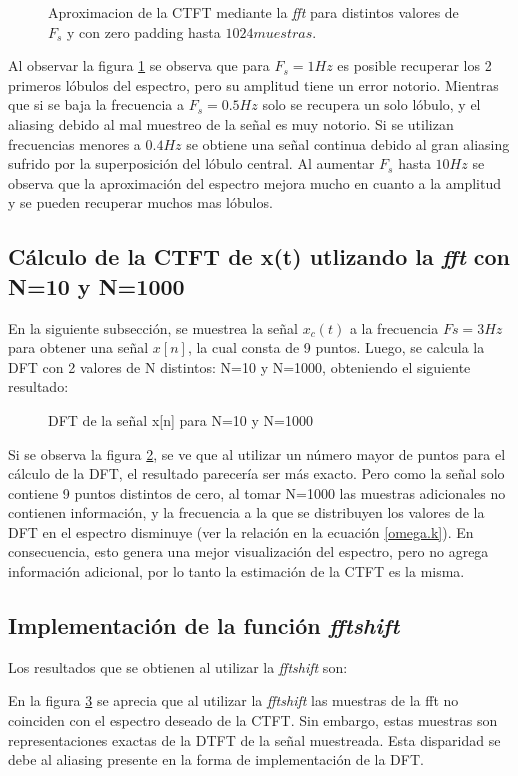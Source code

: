 \documentclass[11pt,a4paper]{article}
\begin{document}
\begin{figure}[H]
    \centering
    \caption{Aproximacion de la CTFT mediante la \textit{fft} para distintos valores de $F_s$ y con zero padding hasta $1024muestras$.}
    \label{fig.4d}
\end{figure}

Al observar la figura \ref{fig.4d} se observa que para $F_s=1Hz$ es posible recuperar los 2 primeros lóbulos del espectro, pero su amplitud 
tiene un error notorio. Mientras que si se baja la frecuencia a $F_s=0.5Hz$ solo se recupera un solo lóbulo, y el aliasing debido al mal muestreo de la señal es muy notorio. Si se utilizan frecuencias menores a $0.4Hz$ se obtiene una señal continua debido al gran aliasing sufrido por la superposición del lóbulo central. Al aumentar $F_s$ hasta $10Hz$ se observa que la aproximación del espectro mejora mucho en cuanto a la amplitud y se pueden recuperar 
muchos mas lóbulos.

 \subsection{Cálculo de la CTFT de x(t) utlizando la \textit{fft} con N=10 y N=1000}
 En la siguiente subsección, se muestrea la señal $x_{c}(t)$ a la frecuencia $Fs=3 Hz$ para obtener una señal $x[n]$, la cual consta de 9 puntos. Luego, se calcula la DFT con 2 valores de N distintos: N=10 y N=1000, obteniendo el siguiente resultado:
 
 \begin{figure}
 \centering
     \caption{DFT de la señal x[n] para N=10 y N=1000}
     \label{fig.4e}
 \end{figure}
 Si se observa la figura \ref{fig.4e}, se ve que al utilizar un número mayor de puntos para el cálculo de la DFT, el resultado parecería ser más exacto. Pero como la señal solo contiene 9 puntos distintos de cero, al tomar N=1000 las muestras adicionales no contienen información, y la frecuencia a la que se distribuyen los valores de la DFT en el espectro disminuye (ver la relación en la ecuación \ref{omega.k}). En consecuencia, esto genera una mejor visualización del espectro, pero no agrega información adicional, por lo tanto la estimación de la CTFT es la misma.



\subsection{Implementación de la función \textit{fftshift}}
Los resultados que se obtienen al utilizar la \textit{fftshift} son:
\begin{figure}[]
    \centering
    \caption{}
    \label{fftshift}
\end{figure}
En la figura \ref{fftshift} se aprecia que al utilizar la \textit{fftshift} las muestras de la fft no coinciden con el espectro deseado de la CTFT. Sin embargo, estas muestras son representaciones exactas de la DTFT de la señal muestreada. Esta disparidad se debe al aliasing presente en la forma de implementación de la DFT.
\end{document}
